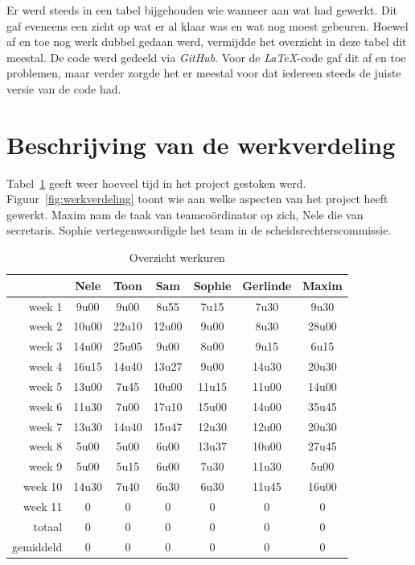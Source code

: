 \documentclass[eind]{penoverslag}
\begin{document}
Er werd steeds in een tabel bijgehouden wie wanneer aan wat had gewerkt. Dit gaf eveneens een zicht op wat er al klaar was en wat nog moest gebeuren. Hoewel af en toe nog werk dubbel gedaan werd, vermijdde het overzicht in deze tabel dit meestal.
De code werd gedeeld via \textit{GitHub}. Voor de \textit{LaTeX}-code gaf dit af en toe problemen, maar verder zorgde het er meestal voor dat iedereen steeds de juiste versie van de code had.


\section{Beschrijving van de werkverdeling}
\label{Asec:werkverdeling}
Tabel~\ref{tab:werkuren} geeft weer hoeveel tijd in het project gestoken werd. Figuur~\ref{fig:werkverdeling} toont wie aan welke aspecten van het project heeft gewerkt.
Maxim nam de taak van teamco\"ordinator op zich, Nele die van secretaris. Sophie vertegenwoordigde het team in de scheidsrechterscommissie.

\begin{table}[h]
\begin{center}
    \begin{tabular}{ r | c  c  c  c  c  c}
     & Nele & Toon & Sam & Sophie & Gerlinde & Maxim \\ \hline
    week 1 & 9u00 & 9u00 & 8u55 & 7u15 & 7u30 & 9u30\\
   	week 2 & 10u00 & 22u10 & 12u00 & 9u00 & 8u30 & 28u00\\
	week 3 & 14u00 & 25u05 & 9u00 & 8u00 & 9u15 & 6u15\\
	week 4 & 16u15 & 14u40 & 13u27 & 9u00 & 14u30 & 20u30\\
	week 5 & 13u00 & 7u45 & 10u00 & 11u15 & 11u00 & 14u00\\
	week 6 & 11u30 & 7u00 & 17u10 & 15u00 & 14u00 & 35u45\\
	week 7 & 13u30 & 14u40 & 15u47 & 12u30 & 12u00 & 20u30\\
	week 8 & 5u00 & 5u00 & 6u00 & 13u37 & 10u00 & 27u45\\
	week 9 & 5u00 & 5u15 & 6u00 & 7u30 & 11u30 & 5u00\\
	week 10 & 14u30 & 7u40 & 6u30 & 6u30 & 11u45 & 16u00\\
	week 11 & 0 & 0 & 0 & 0 & 0 & 0\\ \hline
	totaal & 0 & 0 & 0 & 0 & 0 & 0 \\
	gemiddeld & 0 & 0 & 0 & 0 & 0 & 0
    \end{tabular}
    \caption{Overzicht werkuren}
    \label{tab:werkuren}
\end{center}
\end{table}
\end{document}

